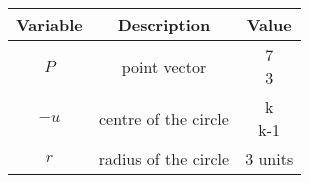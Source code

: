 \begin{tabular}[12pt]{ |c| c| c|}
    \hline
	\textbf{Variable} & \textbf{Description}&\textbf{Value}\\ 
    \hline
	$P$ & point vector & \myvec{7\\3}\\
    \hline 
	$-u$ & centre of the circle & \myvec{k\\k-1}\\
    \hline
	$r$ & radius of the circle & 3 units\\
    \hline
    \end{tabular}
